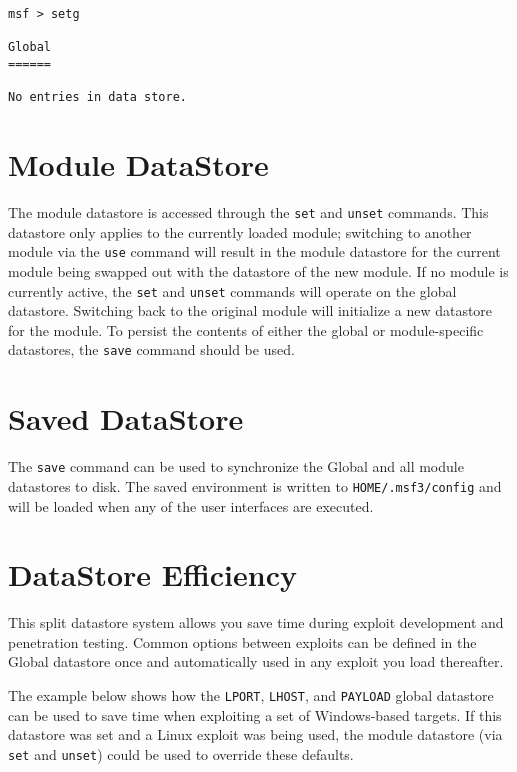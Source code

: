 \documentclass{report}
\begin{document}
\begin{verbatim}
msf > setg

Global
======

No entries in data store.

\end{verbatim}

    \section{Module DataStore}
    \label{ENV-TEMP}
\par

The module datastore is accessed through the \texttt{set} and \texttt{unset}
commands. This datastore only applies to the currently loaded module;
switching to another module via the \texttt{use} command will result in the
module datastore for the current module being swapped out with the datastore
of the new module. If no module is currently active, the \texttt{set} and
\texttt{unset} commands will operate on the global datastore. Switching back
to the original module will initialize a new datastore for the module.  To
persist the contents of either the global or module-specific datastores, the
\texttt{save} command should be used.

    \section{Saved DataStore}
    \label{ENV-SAVE}

\par
The \texttt{save} command can be used to synchronize the Global and all module
datastores to disk. The saved environment is written to
\texttt{HOME/.msf3/config} and will be loaded when any of the user interfaces
are executed.  

    \section{DataStore Efficiency}
    \label{ENV-EFF}

\par
This split datastore system allows you save time during exploit development
and penetration testing. Common options between exploits can be defined in the
Global datastore once and automatically used in any exploit you load thereafter.  

\par
The example below shows how the \texttt{LPORT}, \texttt{LHOST}, and
\texttt{PAYLOAD} global datastore can be used to save time when exploiting a
set of Windows-based targets. If this datastore was set and a Linux exploit
was being used, the module datastore (via \texttt{set} and \texttt{unset})
could be used to override these defaults.  
\end{document}
